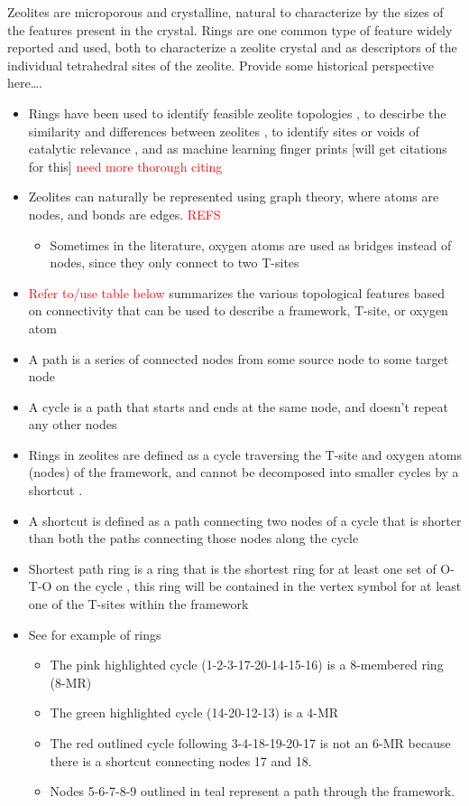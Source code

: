 \documentclass[11pt]{article}
\newcommand{\red}[1]{\textcolor{red}{#1}}
\begin{document}
Zeolites are microporous and crystalline, natural to characterize by the sizes of the features present in the crystal.  Rings are one common type of feature widely reported and used, both to characterize a zeolite crystal and as descriptors of the individual tetrahedral sites of the zeolite.  Provide some historical perspective here\ldots{}.
\begin{itemize}
\item Rings have been used to identify feasible zeolite topologies \cite{li-why-2014}, to descirbe the similarity and differences between zeolites \cite{curtis-statistical-2003}, to identify sites or voids of catalytic relevance \cite{li-first-principles-2018,kester-effects-2021}, and as machine learning finger prints [will get citations for this] \red{need more thorough citing}

\item Zeolites can naturally be represented using graph theory, where atoms are nodes, and bonds are edges. \red{REFS}
\begin{itemize}
\item Sometimes in the literature, oxygen atoms are used as bridges instead of nodes, since they only connect to two T-sites
\end{itemize}
\item \red{Refer to/use table below}  summarizes the various topological features based on connectivity that can be used to describe a framework, T-site, or oxygen atom
\item A path is a series of connected nodes from some source node to some target node
\item A cycle is a path that starts and ends at the same node, and doesn't repeat any other nodes
\item Rings in zeolites are defined as a cycle traversing the T-site and oxygen atoms (nodes) of the framework, and cannot be decomposed into smaller cycles by a shortcut \cite{goetzke-properties-1991,guttman-ring-1990}.
\item A shortcut is defined as a path connecting two nodes of a cycle that is shorter than both the paths connecting those nodes along the cycle \cite{goetzke-properties-1991,guttman-ring-1990}
\item Shortest path ring is a ring that is the shortest ring for at least one set of O-T-O on the cycle \cite{sastre-topological-2009}, this ring will be contained in the vertex symbol for at least one of the T-sites within the framework
\item See  for example of rings
\begin{itemize}
\item The pink highlighted cycle (1-2-3-17-20-14-15-16) is a 8-membered ring (8-MR)
\item The green highlighted cycle (14-20-12-13) is a 4-MR
\item The red outlined cycle following 3-4-18-19-20-17 is not an 6-MR because there is a shortcut connecting nodes 17 and 18.
\item Nodes 5-6-7-8-9 outlined in teal represent a path through the framework.
\end{itemize}
\end{itemize}
\end{document}
